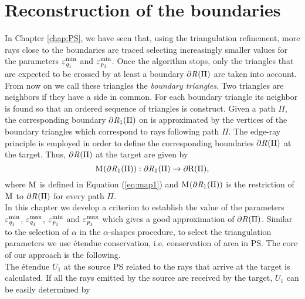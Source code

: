 \section{Reconstruction of the boundaries}
In Chapter \ref{chap:PS}, we have seen that, using the triangulation refinement, more rays close to the boundaries are traced selecting increasingly smaller values for the parameters $\varepsilon_{\textit{q}_1}^{\textrm{min}}$ and $\varepsilon_{\textit{p}_1}^{\textrm{min}}$. Once the algorithm stops, only the triangles that are expected to be crossed by at least a boundary $\partial \mbox{$\emph{R}_{\textit{}}$}(\Pi)$ are taken into account. From now on we call these triangles the \textit{boundary triangles}. Two triangles are neighbors if they have a side in common. For each boundary triangle its neighbor is found so that an ordered sequence of triangles is construct. Given a path $\Pi$, the corresponding boundary $\partial\mbox{$\emph{R}_{\textit{$1$}}$}(\Pi)$ on  is approximated by the vertices of the boundary triangles which correspond to rays following path $\Pi$. The edge-ray principle is employed in order to define the corresponding boundaries $\partial \mbox{$\emph{R}_{\textit{}}$}(\Pi)$ at the target.
Thus, $\partial \mbox{$\emph{R}_{\textit{}}$}(\Pi)$ at the target are given by
\begin{equation}\mathrm{M}_{\textit{}}(\partial\mbox{$\emph{R}_{\textit{$1$}}$}(\Pi)):\partial\mbox{$\emph{R}_{\textit{$1$}}$}(\Pi)\rightarrow\partial\mbox{{R}{}{}}(\Pi),\end{equation}
where $\mathrm{M}_{\textit{}}$ is defined in Equation (\ref{eq:map1}) and $\mathrm{M}_{\textit{}}(\partial\mbox{$\emph{R}_{\textit{$1$}}$}(\Pi))$ is the restriction of $\mathrm{M}_{\textit{}}$ to $\partial\mbox{$\emph{R}_{\textit{}}$}(\Pi)$ for every path 
$\Pi$. \\\indent In this chapter we develop a criterion to establish the value of the parameters $\varepsilon_{\textit{q}_1}^{\textrm{min}}$, $\varepsilon_{\textit{q}_1}^{\textrm{max}}$, $\varepsilon_{\textit{p}_1}^{\textrm{min}}$ and $\varepsilon_{\textit{p}_1}^{\textrm{max}}$ which gives a good approximation of $\partial \mbox{$\emph{R}_{\textit{}}$}(\Pi)$.
 Similar to the selection of $\alpha$ in the $\alpha$-shapes procedure, to select the triangulation parameters we use \'{e}tendue conservation, i.e. conservation of area in PS. The core of our approach is the following.\\
\indent The \'{e}tendue $U_1$ at the source PS  related to the rays that arrive at the target is calculated. If all the rays emitted by the source are received by the target, $U_1$ can be easily determined by
